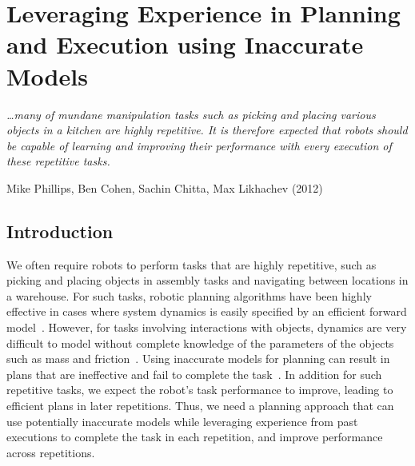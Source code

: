 \chapter{Leveraging Experience in Planning and Execution
  using Inaccurate Models}
\label{cha:lever-exper}

\epigraph{\textit{\ldots many of mundane manipulation tasks
such as picking and placing various objects in a kitchen are
highly repetitive. It is therefore expected that robots should
be capable of learning and improving their performance with
every execution of these repetitive tasks.}}{Mike Phillips, Ben Cohen,
Sachin Chitta, Max Likhachev (2012)}

\section{Introduction}
\label{sec:introduction}

We often require robots to perform tasks that are highly repetitive,
such as picking and placing objects in assembly tasks and navigating
between locations in a warehouse. For such tasks,
robotic planning algorithms have been highly effective in cases where
system dynamics is easily specified by an efficient forward
model~\cite{DBLP:conf/icra/BerensonAG12}. However, for
tasks involving interactions with objects, dynamics are very
difficult to model without
complete knowledge of the parameters of the
objects such as mass and friction~\cite{DBLP:journals/ijrr/JiX01}. 
Using
inaccurate models for planning can result in plans
that are ineffective and fail to complete the
task~\cite{DBLP:journals/ral/McConachiePMB20}. 
In addition for such
repetitive tasks, we expect the robot's task performance to
improve, leading to efficient plans in later repetitions.
Thus, we need
a planning approach that can use potentially inaccurate models while leveraging
experience from
past executions to complete the task in each repetition, and improve
performance across repetitions.


